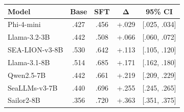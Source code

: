 \begin{tabular}{@{} l c c c c @{}}
\toprule
\textbf{Model} & \textbf{Base} & \textbf{SFT} & $\boldsymbol{\Delta}$ & \textbf{95\% CI} \\
\midrule
Phi-4-mini & .427 & .456 & +.029 & [.025, .034] \\
Llama-3.2-3B & .442 & .508 & +.066 & [.060, .072] \\
SEA-LION-v3-8B & .530 & .642 & +.113 & [.105, .120] \\
Llama-3.1-8B & .514 & .685 & +.171 & [.162, .180] \\
Qwen2.5-7B & .442 & .661 & +.219 & [.209, .229] \\
SeaLLMs-v3-7B & .440 & .696 & +.255 & [.245, .265] \\
Sailor2-8B & .356 & .720 & +.363 & [.351, .375] \\
\bottomrule
\end{tabular}

